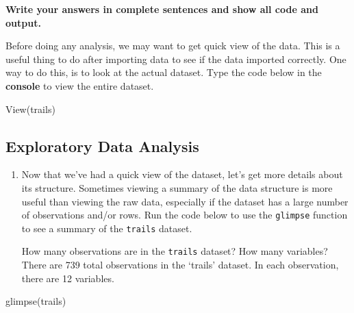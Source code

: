 \documentclass[
]{article}
\newenvironment{Shaded}{\begin{snugshade}}{\end{snugshade}}
\newcommand{\FunctionTok}[1]{\textcolor[rgb]{0.00,0.00,0.00}{#1}}
\newcommand{\NormalTok}[1]{#1}
\begin{document}
\textbf{Write your answers in complete sentences and show all code and
output.}

Before doing any analysis, we may want to get quick view of the data.
This is a useful thing to do after importing data to see if the data
imported correctly. One way to do this, is to look at the actual
dataset. Type the code below in the \textbf{console} to view the entire
dataset.

\begin{Shaded}
\begin{Highlighting}[]
\FunctionTok{View}\NormalTok{(trails)}
\end{Highlighting}
\end{Shaded}

\hypertarget{exploratory-data-analysis}{%
\subsection{Exploratory Data Analysis}\label{exploratory-data-analysis}}

\begin{enumerate}
\def\labelenumi{\arabic{enumi}.}
\item
  Now that we've had a quick view of the dataset, let's get more details
  about its structure. Sometimes viewing a summary of the data structure
  is more useful than viewing the raw data, especially if the dataset
  has a large number of observations and/or rows. Run the code below to
  use the \texttt{glimpse} function to see a summary of the
  \texttt{trails} dataset.

  How many observations are in the \texttt{trails} dataset? How many
  variables? There are 739 total observations in the `trails' dataset.
  In each observation, there are 12 variables.
\end{enumerate}

\begin{Shaded}
\begin{Highlighting}[]
\FunctionTok{glimpse}\NormalTok{(trails)}
\end{Highlighting}
\end{Shaded}
\end{document}
